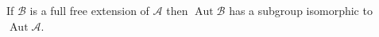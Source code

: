 If $\mathcal{B}$ is a full free extension of $\mathcal{A}$ then $\operatorname{Aut}\mathcal{B}$ has a subgroup isomorphic to $\operatorname{Aut}\mathcal{A}$.
